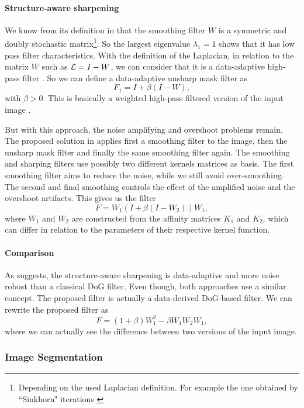 \paragraph{Structure-aware sharpening}
We know from its definition in \cite{kheradmand_non-linear_2015} that the smoothing filter \(W\) is a symmetric and doubly stochastic matrix\footnote{Depending on the used Laplacian definition. For example the one obtained by ``Sinkhorn" iterations \cite{milanfar_symmetrizing_2013}}.
So the largest eigenvalue \(\lambda_1 = 1\) shows that it has low pass filter characteristics.
With the definition of the Laplacian, in relation to the matrix \(W\) such as \(\operatorname{\mathcal{L}} = I - W\), we can consider that it is a data-adaptive high-pass filter \cite{kheradmand_graph-based_2016}.
So we can define a data-adaptive unsharp mask filter as
\[F_1 = I + \beta (I-W),\]
with \(\beta > 0\). This is basically a weighted high-pass filtered version of the input image \cite{siam_slides_2016}.

But with this approach, the noise amplifying and overshoot problems remain.
The proposed solution in \cite{kheradmand_non-linear_2015} applies first a smoothing filter to the image, then the unsharp mask filter and finally the same smoothing filter again.
The smoothing and sharping filters use possibly two different kernels matrices as basis.
The first smoothing filter aims to reduce the noise, while we still avoid over-smoothing.
The second and final smoothing controls the effect of the amplified noise and the overshoot artifacts.
This gives us the filter
\[F = W_1(I + \beta (I - W_2))W_1,\]
where \(W_1\) and \(W_2\) are constructed from the affinity matrices \(K_1\) and \(K_2\), which can differ in relation to the parameters of their respective kernel function.

\paragraph{Comparison}
As \cite{kheradmand_non-linear_2015} suggests, the structure-aware sharpening is data-adaptive and more noise robust than a classical DoG filter.
Even though, both approaches use a similar concept.
The proposed filter is actually a data-derived DoG-based filter.
We can rewrite the proposed filter as
\[F = (1+\beta) W_1^2 - \beta W_1 W_2 W_1,\]
where we can actually see the difference between two versions of the input image.

\subsubsection{Image Segmentation}

